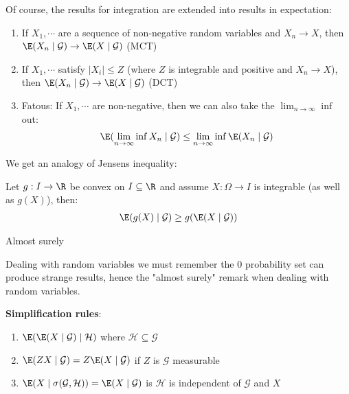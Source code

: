 \par\bigskip
\noindent Of course, the results for integration are extended into results in expectation:
\par\bigskip
\begin{theo}[]{}
  \begin{enumerate}[leftmargin=*]
    \item If $X_1,\cdots$ are a sequence of non-negative random variables and $X_n\to X$, then $\E(X_n\mid\mathcal{G})\to \E(X\mid\mathcal{G})$ (MCT)
    \item If $X_1,\cdots$ satisfy $\left|X_i\right|\leq Z$ (where $Z$ is integrable and positive and $X_n\to X$), then $\E(X_n\mid\mathcal{G})\to\mathcal \E(X\mid\mathcal{G})$ (DCT)
    \item Fatous: If $X_1,\cdots$ are non-negative, then we can also take the $\lim_{n\to\infty}\inf$ out:
      \begin{equation*}
        \begin{gathered}
          \E(\lim_{n\to\infty}\inf X_n\mid\mathcal{G})\leq\lim_{n\to\infty}\inf\E(X_n\mid\mathcal{G})
        \end{gathered}
      \end{equation*}
  \end{enumerate}
\end{theo}
\par\bigskip
\noindent We get an analogy of Jensens inequality:
\par\bigskip
\begin{theo}{}
  Let $g:I\to\R$ be convex on $I\subseteq \R$ and assume $X:\Omega\to I$ is integrable (as well as $g(X)$), then:
  \begin{equation*}
    \begin{gathered}
      \E(g(X)\mid\mathcal{G}) \geq g(\E(X\mid\mathcal{G}))
    \end{gathered}
  \end{equation*}\par
  \noindent Almost surely 
\end{theo}\par
\noindent Dealing with random variables we must remember the 0 probability set can produce strange results, hence the "almost surely" remark when dealing with random variables.
\par\bigskip
\noindent\textbf{Simplification rules}:\par
\begin{enumerate}[leftmargin=*]
  \item $\E(\E(X\mid\mathcal{G})\mid\mathcal{H})$ where $\mathcal{H}\subseteq\mathcal{G}$
  \item $\E(ZX\mid\mathcal{G}) = Z\E(X\mid\mathcal{G})$ if $Z$ is $\mathcal{G}$ measurable
  \item $\E(X\mid\sigma(\mathcal{G},\mathcal{H})) = \E(X\mid\mathcal{G})$ is $\mathcal{H}$ is independent of $\mathcal{G}$ and $X$
\end{enumerate}
